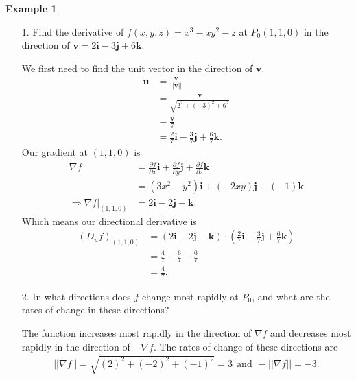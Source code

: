 \documentclass[12pt, letter]{article}
\theoremstyle{plain}
\numberwithin{theorem}{section}
\theoremstyle{definition}
\newtheorem{example}[theorem]{Example}
\begin{document}
\bigskip

\hrulefill

\bigskip

\begin{example}
\begin{itemize}
\item[1.] Find the derivative of $f(x,y,z) = x^3 - xy^2-z$ at $P_0(1,1,0)$ in the direction of $\bm{v} = 2\bm{i} - 3\bm{j} + 6\bm{k}$.

\smallskip

We first need to find the unit vector in the direction of $\bm{v}$.
\begin{align*}
\bm{u} &= \frac{\bm{v}}{||\bm{v}||}\\
&= \frac{\bm{v}}{\sqrt{2^2+(-3)^2+6^2}}\\
&= \frac{\bm{v}}{7}\\
&= \frac{2}{7}\bm{i} - \frac{3}{7}\bm{j} + \frac{6}{7}\bm{k}.
\end{align*}
Our gradient at $(1,1,0)$ is
\begin{align*}
\nabla f &= \frac{\partial f}{\partial x} \bm{i} + \frac{\partial f}{\partial y} \bm{j} + \frac{\partial f}{\partial z} \bm{k}\\
&= (3x^2-y^2)\bm{i} + (-2xy)\bm{j} +(-1)\bm{k}\\
\Rightarrow \nabla f \rvert_{(1,1,0)} &= 2\bm{i} - 2\bm{j} - \bm{k}.
\end{align*}
Which means our directional derivative is
\begin{align*}
(D_u f)_{(1,1,0)} &= \left(2\bm{i} - 2\bm{j} - \bm{k}\right) \cdot \left(\frac{2}{7}\bm{i} - \frac{3}{7}\bm{j} + \frac{6}{7}\bm{k}\right)\\
&= \frac{4}{7} + \frac{6}{7} -\frac{6}{7}\\
&= \frac{4}{7}.
\end{align*}

\item[2.] In what directions does $f$ change most rapidly at $P_0$, and what are the rates of change in these directions?

\smallskip

The function increases most rapidly in the direction of $\nabla f$ and decreases most rapidly in the direction of $-\nabla f$. The rates of change of these directions are
\begin{align*}
||\nabla f|| = \sqrt{(2)^2+(-2)^2+(-1)^2} = 3 \ \ \text{and} \ \ - ||\nabla f|| = -3.
\end{align*}
\end{itemize}
\end{example}
\end{document}
